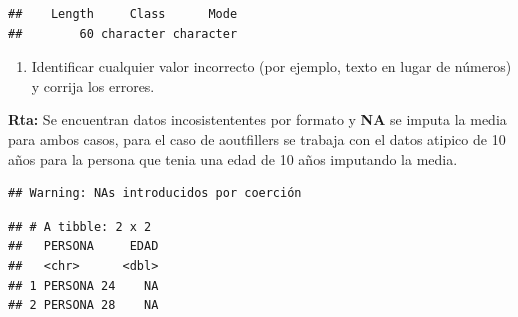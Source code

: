 \documentclass[
]{article}
\newenvironment{Shaded}{\begin{snugshade}}{\end{snugshade}}
\newcommand{\CommentTok}[1]{\textcolor[rgb]{0.56,0.35,0.01}{\textit{#1}}}
\newcommand{\FunctionTok}[1]{\textcolor[rgb]{0.13,0.29,0.53}{\textbf{#1}}}
\newcommand{\NormalTok}[1]{#1}
\newcommand{\OtherTok}[1]{\textcolor[rgb]{0.56,0.35,0.01}{#1}}
\newcommand{\SpecialCharTok}[1]{\textcolor[rgb]{0.81,0.36,0.00}{\textbf{#1}}}
\newcommand{\StringTok}[1]{\textcolor[rgb]{0.31,0.60,0.02}{#1}}
\providecommand{\tightlist}{%
  \setlength{\itemsep}{0pt}\setlength{\parskip}{0pt}}
\begin{document}
\begin{verbatim}
##    Length     Class      Mode 
##        60 character character
\end{verbatim}

\begin{enumerate}
\def\labelenumi{\alph{enumi}.}
\setcounter{enumi}{1}
\tightlist
\item
  Identificar cualquier valor incorrecto (por ejemplo, texto en lugar de
  números) y corrija los errores.
\end{enumerate}

\textbf{Rta: }Se encuentran datos incosistententes por formato y
\textbf{NA} se imputa la media para ambos casos, para el caso de
aoutfillers se trabaja con el datos atipico de 10 años para la persona
que tenia una edad de 10 años imputando la media.

\begin{Shaded}
\end{Shaded}

\begin{verbatim}
## Warning: NAs introducidos por coerción
\end{verbatim}

\begin{Shaded}
\end{Shaded}

\begin{verbatim}
## # A tibble: 2 x 2
##   PERSONA     EDAD
##   <chr>      <dbl>
## 1 PERSONA 24    NA
## 2 PERSONA 28    NA
\end{verbatim}
\end{document}

